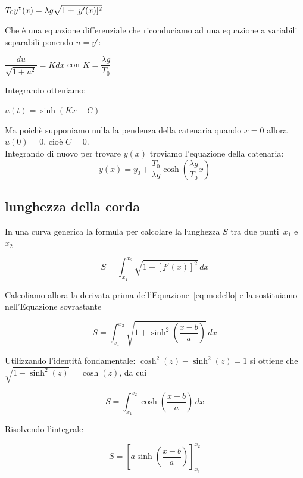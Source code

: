 \documentclass[a4paper,12pt]{article}
\begin{document}
\begin{center}
    

    $T_0y"(x)=\lambda g\sqrt{1+[y'(x)]^2}$
    
\end{center}
Che è una equazione differenziale che riconduciamo ad una equazione a variabili separabili ponendo $u=y'$:\\
\begin{center}
    $\dfrac{du}{\sqrt{1+u^2}}=Kdx$ con $K=\dfrac{\lambda g}{T_0}$\\
\end{center}
    Integrando otteniamo:
    \begin{center}
        $u(t)=\sinh(Kx+C)$\\
    \end{center}
    
    Ma poichè supponiamo nulla la pendenza della catenaria quando $x=0$ allora $u(0)=0$, cioè $C=0$.\\
    Integrando di nuovo per trovare $y(x)$ troviamo l'equazione della catenaria:\\

\begin{equation}
    y(x)=y_0+\dfrac{T_0}{\lambda g}\cosh\left( \dfrac{\lambda g}{T_0}x\right )
    \label{eq:cat_rudi}
\end{equation}

\subsection{lunghezza della corda}

In una curva generica la formula per calcolare la lunghezza $S$ tra due punti~$x_1$ e~$x_2$

\[ S = \int_{x_1}^{x_2} \sqrt{1 + {[f'(x)]}^2} \,dx \]

Calcoliamo allora la derivata prima dell'Equazione~\ref{eq:modello} e la sostituiamo nell'Equazione sovrastante

\[ S = \int_{x_1}^{x_2} \sqrt{1 + {\sinh^2{ \left(\dfrac{x-b}{a} \right) }}} \,dx \]

Utilizzando l'identità fondamentale: $\cosh^2{(z)} - \sinh^2{(z)} = 1$ si ottiene che $\sqrt{1 - \sinh^2{(z)}} = \cosh(z)$, da cui

\[ S = \int_{x_1}^{x_2} \cosh \left(\dfrac{x - b}{a} \right) \,dx \]

Risolvendo l'integrale

\[ S = \left[ a \sinh \left( \dfrac{x-b}{a} \right) \right]_{x_1}^{x_2} \]
\end{document}
